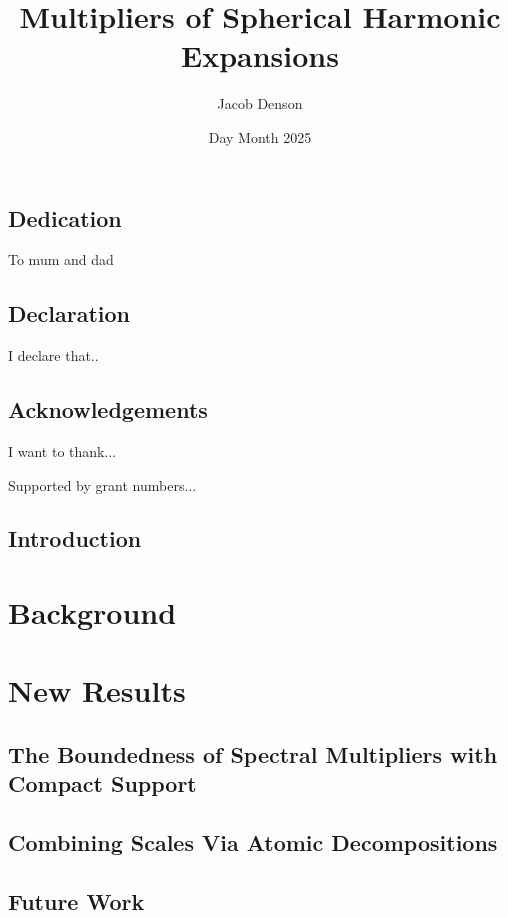 \documentclass[12pt]{report}
\title{Multipliers of Spherical Harmonic Expansions}
\author{Jacob Denson}
\date{Day Month 2025}
\theoremstyle{plain}
\theoremstyle{remark}
\theoremstyle{definition}
\begin{document}





\chapter*{Dedication}

To mum and dad

\chapter*{Declaration}

I declare that..

\chapter*{Acknowledgements}

I want to thank...

Supported by grant numbers...

\tableofcontents


\listoffigures
\listoftables



\chapter*{Introduction}



\part{Background}


%

\part{New Results}
\chapter{The Boundedness of Spectral Multipliers with Compact Support}


\chapter{Combining Scales Via Atomic Decompositions}


\chapter{Future Work}


%

\singlespacing
\printbibliography
\end{document}
